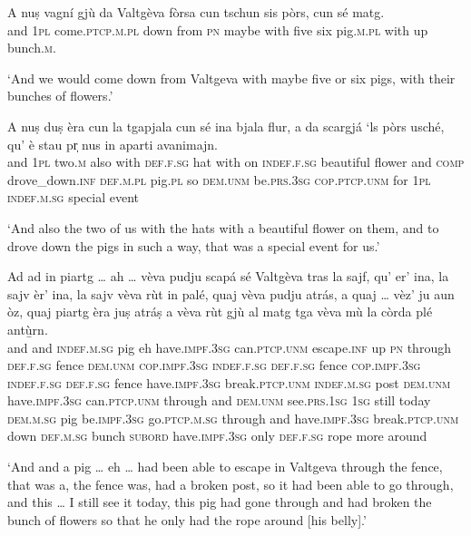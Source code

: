 \begin{linenumbers}
	\gll   A nuṣ vagní gjù da Valtgèva fòrsa cun tschun sis pòrs, cun sé matg. \\
	and \textsc{1pl}  come.\textsc{ptcp.m.pl} down from  \textsc{pn} maybe with five six  pig.\textsc{m.pl} with up bunch.\textsc{m.}\\
\end{linenumbers}
\medskip
\glt `And we would come down from Valtgeva with maybe five or six pigs, with their bunches of flowers.'
\medskip

\begin{linenumbers}
	\gll    A nuṣ duṣ èra cun la tgapjala cun sé ina bjala flur, a da scargjá\footnotemark{} `ls pòrs usché, qu’ è stau pr̩ nus in aparti avanimajn.\\
	and \textsc{1pl} two.\textsc{m} also with \textsc{def.f.sg} hat with on \textsc{indef.f.sg} beautiful flower and \textsc{comp} drove\_down.\textsc{inf}  \textsc{def.m.pl} pig.\textsc{pl} so \textsc{dem.unm} be.\textsc{prs.3sg} \textsc{cop.ptcp.unm} for \textsc{1pl} \textsc{indef.m.sg} special event\\
\end{linenumbers}
\medskip
\glt `And also the two of us with the hats with a beautiful flower on them, and to drove down the pigs in such a way, that was a special event for us.'
\medskip

\begin{linenumbers}
	\gll    Ad ad in piartg … ah … vèva pudju scapá sé Valtgèva tras la sajf, qu’ er’ ina, la sajv èr' ina, la sajv vèva rùt in palé, quaj vèva pudju atrás, a quaj … vèz' ju aun òz, quaj piartg èra juṣ atráṣ a vèva rùt gjù al matg tga vèva mù la còrda plé antù̱rn.\\
	and and \textsc{indef.m.sg} pig {} eh {}  have.\textsc{impf.3sg} can.\textsc{ptcp.unm} escape.\textsc{inf} up \textsc{pn} through \textsc{def.f.sg} fence \textsc{dem.unm} \textsc{cop.impf.3sg} \textsc{indef.f.sg} \textsc{def.f.sg} fence \textsc{cop.impf.3sg} \textsc{indef.f.sg} \textsc{def.f.sg} fence  have.\textsc{impf.3sg} break.\textsc{ptcp.unm}  \textsc{indef.m.sg} post \textsc{dem.unm}  have.\textsc{impf.3sg} can.\textsc{ptcp.unm} through and  \textsc{dem.unm} {} see.\textsc{prs.1sg} \textsc{1sg} still today \textsc{dem.m.sg} pig be.\textsc{impf.3sg} go.\textsc{ptcp.m.sg} through and have.\textsc{impf.3sg} break.\textsc{ptcp.unm} down \textsc{def.m.sg} bunch  \textsc{subord} have.\textsc{impf.3sg} only \textsc{def.f.sg} rope more around\\
\end{linenumbers}
\medskip
\glt `And and a pig … eh … had been able to escape in Valtgeva through the fence, that was a, the fence was, had a broken post, so it had been able to go through, and this … I still see it today, this pig had gone through and had broken the bunch of flowers so that he only had the rope around [his belly].'
\medskip

